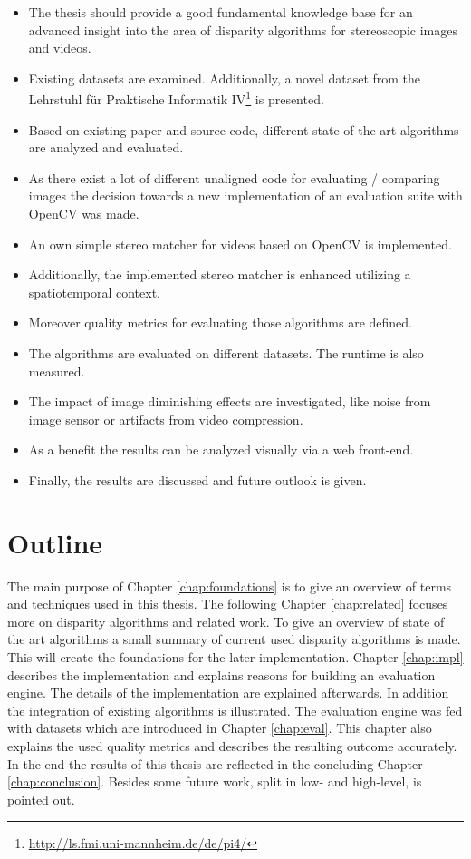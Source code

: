 \begin{itemize}
	\item The thesis should provide a good fundamental knowledge base for an advanced insight into the area of disparity algorithms for stereoscopic images and videos.
	\item Existing datasets are examined. Additionally, a novel dataset from the Lehrstuhl f{\"u}r Praktische Informatik IV\footnote{\url{http://ls.fmi.uni-mannheim.de/de/pi4/}} is presented.
	\item Based on existing paper and source code, different state of the art algorithms are analyzed and evaluated.
	\item As there exist a lot of different unaligned code for evaluating / comparing images the decision towards a new implementation of an evaluation suite with OpenCV was made.
	\item An own simple stereo matcher for videos based on OpenCV is implemented.
	\item Additionally, the implemented stereo matcher is enhanced utilizing a spatiotemporal context.
	\item Moreover quality metrics for evaluating those algorithms are defined.
	\item The algorithms are evaluated on different datasets. The runtime is also measured.
	\item The impact of image diminishing effects are investigated, like noise from image sensor or artifacts from video compression.
	\item As a benefit the results can be analyzed visually via a web front-end.
	\item Finally, the results are discussed and future outlook is given.
\end{itemize}

\section{Outline}

The main purpose of Chapter \ref{chap:foundations} is to give an overview of terms and techniques used in this thesis.
The following Chapter \ref{chap:related} focuses more on disparity algorithms and related work.
To give an overview of state of the art algorithms a small summary of current used disparity algorithms is made.
This will create the foundations for the later implementation.
Chapter \ref{chap:impl} describes the implementation and explains reasons for building an evaluation engine.
The details of the implementation are explained afterwards.
In addition the integration of existing algorithms is illustrated.
The evaluation engine was fed with datasets which are introduced in Chapter \ref{chap:eval}.
This chapter also explains the used quality metrics and describes the resulting outcome accurately.
In the end the results of this thesis are reflected in the concluding Chapter \ref{chap:conclusion}.
Besides some future work, split in low- and high-level, is pointed out.
